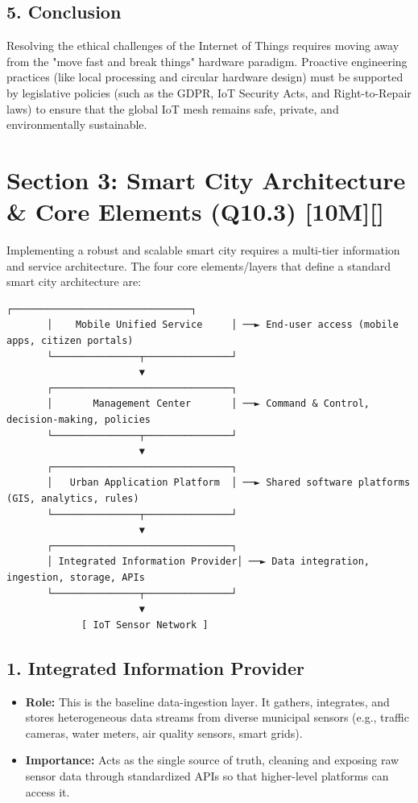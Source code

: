 \subsection{5. Conclusion}
Resolving the ethical challenges of the Internet of Things requires moving away from the "move fast and break things" hardware paradigm. Proactive engineering practices (like local processing and circular hardware design) must be supported by legislative policies (such as the GDPR, IoT Security Acts, and Right-to-Repair laws) to ensure that the global IoT mesh remains safe, private, and environmentally sustainable.


\section{Section 3: Smart City Architecture \& Core Elements (Q10.3) [10M][]}

Implementing a robust and scalable smart city requires a multi-tier information and service architecture. The four core elements/layers that define a standard smart city architecture are:

\begin{lstlisting}
┌───────────────────────────────┐
       │    Mobile Unified Service     │ ──► End-user access (mobile apps, citizen portals)
       └───────────────┬───────────────┘
                       ▼
       ┌───────────────────────────────┐
       │       Management Center       │ ──► Command & Control, decision-making, policies
       └───────────────┬───────────────┘
                       ▼
       ┌───────────────────────────────┐
       │   Urban Application Platform  │ ──► Shared software platforms (GIS, analytics, rules)
       └───────────────┬───────────────┘
                       ▼
       ┌───────────────────────────────┐
       │ Integrated Information Provider│ ──► Data integration, ingestion, storage, APIs
       └───────────────┬───────────────┘
                       ▼
             [ IoT Sensor Network ]
\end{lstlisting}

\subsection{1. Integrated Information Provider}
\begin{itemize}
  \item   \textbf{Role:} This is the baseline data-ingestion layer. It gathers, integrates, and stores heterogeneous data streams from diverse municipal sensors (e.g., traffic cameras, water meters, air quality sensors, smart grids).
  \item   \textbf{Importance:} Acts as the single source of truth, cleaning and exposing raw sensor data through standardized APIs so that higher-level platforms can access it.
\end{itemize}

